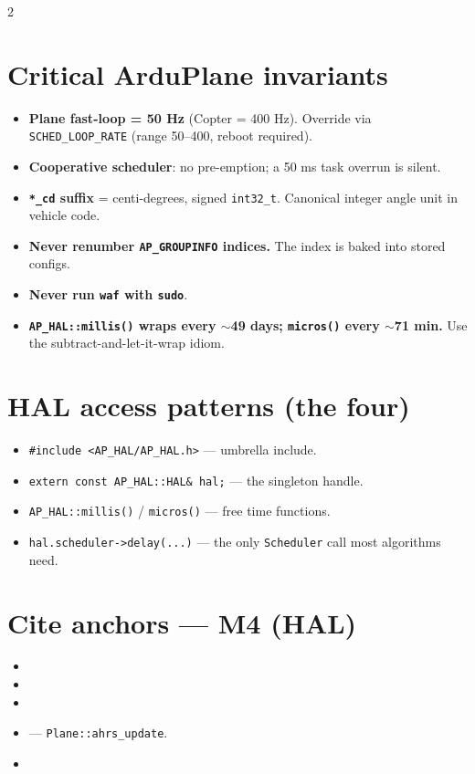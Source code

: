\begin{multicols}{2}
\section*{Critical ArduPlane invariants}
\begin{itemize}\footnotesize
  \item \textbf{Plane fast-loop = 50 Hz} (Copter = 400 Hz). Override via \texttt{SCHED\_LOOP\_RATE} (range 50--400, reboot required).
  \item \textbf{Cooperative scheduler}: no pre-emption; a 50 ms task overrun is silent.
  \item \textbf{\texttt{*\_cd} suffix} = centi-degrees, signed \texttt{int32\_t}. Canonical integer angle unit in vehicle code.
  \item \textbf{Never renumber \texttt{AP\_GROUPINFO} indices.} The index is baked into stored configs.
  \item \textbf{Never run \texttt{waf} with \texttt{sudo}}.
  \item \textbf{\texttt{AP\_HAL::millis()} wraps every $\sim$49 days; \texttt{micros()} every $\sim$71 min.} Use the subtract-and-let-it-wrap idiom.
\end{itemize}

\section*{HAL access patterns (the four)}
\begin{itemize}\footnotesize
  \item \texttt{\#include <AP\_HAL/AP\_HAL.h>} --- umbrella include.
  \item \texttt{extern const AP\_HAL::HAL\& hal;} --- the singleton handle.
  \item \texttt{AP\_HAL::millis()} / \texttt{micros()} --- free time functions.
  \item \texttt{hal.scheduler->delay(...)} --- the only \texttt{Scheduler} call most algorithms need.
\end{itemize}

\section*{Cite anchors --- M4 (HAL)}
\begin{itemize}\footnotesize
  \item {}
  \item {}
  \item {}
  \item {} --- \texttt{Plane::ahrs\_update}.
  \item {}
\end{itemize}


\end{multicols}
